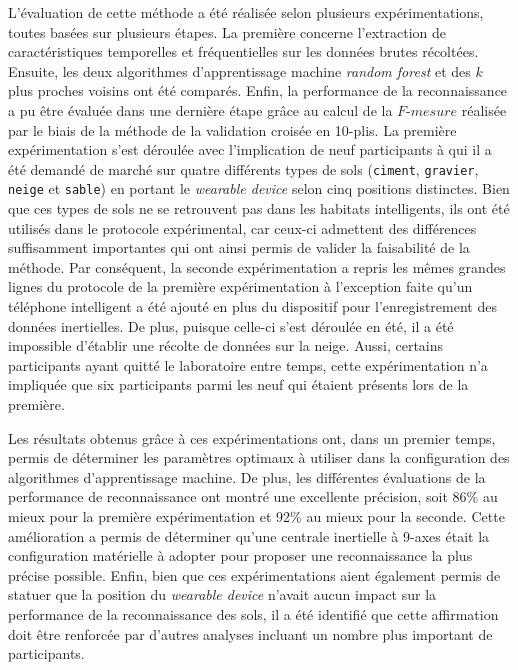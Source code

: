 L'évaluation de cette méthode a été réalisée selon plusieurs expérimentations, toutes basées sur plusieurs étapes. La première concerne l'extraction de caractéristiques temporelles et fréquentielles sur les données brutes récoltées. Ensuite, les deux algorithmes d'apprentissage machine \textit{random forest} et des $k$ plus proches voisins ont été comparés. Enfin, la performance de la reconnaissance a pu être évaluée dans une dernière étape grâce au calcul de la $F\mbox{-} mesure$ réalisée par le biais de la méthode de la validation croisée en 10-plis. La première expérimentation s'est déroulée avec l'implication de neuf participants à qui il a été demandé de marché sur quatre différents types de sols (\texttt{ciment}, \texttt{gravier}, \texttt{neige} et \texttt{sable}) en portant le \textit{wearable device} selon cinq positions distinctes. Bien que ces types de sols ne se retrouvent pas dans les habitats intelligents, ils ont été utilisés dans le protocole expérimental, car ceux-ci admettent des différences suffisamment importantes qui ont ainsi permis de valider la faisabilité de la méthode. Par conséquent, la seconde expérimentation a repris les mêmes grandes lignes du protocole de la première expérimentation à l'exception faite qu'un téléphone intelligent a été ajouté en plus du dispositif pour l'enregistrement des données inertielles. De plus, puisque celle-ci s'est déroulée en été, il a été impossible d'établir une récolte de données sur la neige. Aussi, certains participants ayant quitté le laboratoire entre temps, cette expérimentation n'a impliquée que six participants parmi les neuf qui étaient présents lors de la première.

Les résultats obtenus grâce à ces expérimentations ont, dans un premier temps, permis de déterminer les paramètres optimaux à utiliser dans la configuration des algorithmes d'apprentissage machine. De plus, les différentes évaluations de la performance de reconnaissance ont montré une excellente précision, soit 86\% au mieux pour la première expérimentation et 92\% au mieux pour la seconde. Cette amélioration a permis de déterminer qu'une centrale inertielle à 9-axes était la configuration matérielle à adopter pour proposer une reconnaissance la plus précise possible. Enfin, bien que ces expérimentations aient également permis de statuer que la position du \textit{wearable device} n'avait aucun impact sur la performance de la reconnaissance des sols, il a été identifié que cette affirmation doit être renforcée par d'autres analyses incluant un nombre plus important de participants.
